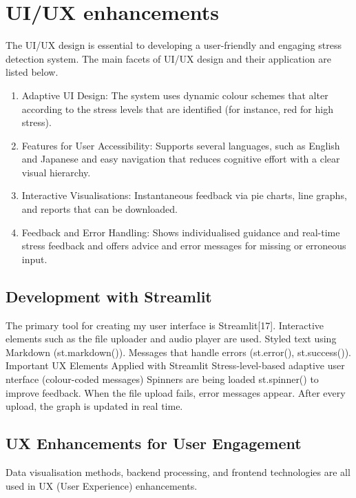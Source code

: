 \documentclass[Arial,12pt,openright,twoside]{book}
\begin{document}
 \section{UI/UX enhancements}
 The UI/UX design\cite{akhmedov2023} is essential to developing a user-friendly and engaging stress detection system. The main facets of UI/UX design and their application are listed below.
 \begin{enumerate}
 \item Adaptive UI Design: The system uses dynamic colour schemes that alter according to the stress levels that are identified (for instance, red for high stress). 
\item Features for User Accessibility: Supports several languages, such as English and Japanese and easy navigation that reduces cognitive effort with a clear visual hierarchy. 
\item Interactive Visualisations: Instantaneous feedback via pie charts, line graphs, and reports that can be downloaded. 
\item Feedback and Error Handling: Shows individualised guidance and real-time stress feedback and offers advice and error messages for missing or erroneous input.
\end{enumerate}
 \subsection{Development with Streamlit}
The primary tool for creating my user interface is Streamlit[17]. Interactive elements such as the file uploader and audio player are used. Styled text using Markdown (st.markdown()). Messages that handle errors (st.error(), st.success()). Important UX Elements Applied with Streamlit
Stress-level-based adaptive user nterface (colour-coded messages)
Spinners are being loaded st.spinner() to improve feedback.
When the file upload fails, error messages appear.
After every upload, the graph is updated in real time.

\subsection{UX Enhancements for User Engagement}
    Data visualisation methods, backend processing, and frontend technologies are all used in UX (User Experience) enhancements.
\end{document}
